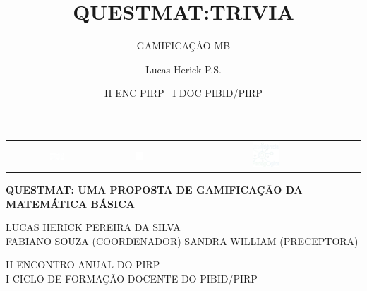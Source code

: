 \documentclass[10pt]{beamer}
\begin{document}
	
\color{white}
\pagecolor{black}
	
\author{Lucas Herick P.S.}
\title{QUESTMAT:TRIVIA}
\subtitle{GAMIFICAÇÂO MB}
\date{II ENC PIRP \ I DOC PIBID/PIRP}
	
\begin{frame}

			\begin{table}
			\begin{tabular}{ccc}
			 
			\includegraphics[width=0.15\textwidth]{UFF_LOGO_wt.png} & \includegraphics[width=0.15\textwidth]{CAPES_LOGO_wt.png} &
			\includegraphics[width=0.15\textwidth]{PIRP_LOGO_wt.png}\\													 	     
			\end{tabular}  
   			\end{table}
 



\begin{block}{}
	
	\begin{center}
		\textbf{\large \textcolor[rgb]{1.0, 0.21, 0.37}{QUESTMAT: UMA PROPOSTA DE GAMIFICAÇÃO DA MATEMÁTICA BÁSICA}}
	\end{center}
\end{block}



\begin{center}
	LUCAS HERICK PEREIRA DA SILVA \\
	{\small FABIANO SOUZA (COORDENADOR) SANDRA WILLIAM (PRECEPTORA)\\}
	
	\vspace{5mm}
	II ENCONTRO ANUAL DO PIRP  \\ I CICLO DE FORMAÇÃO DOCENTE DO PIBID/PIRP

\end{center}

\end{frame}
\end{document}
